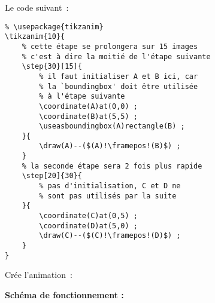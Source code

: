 \documentclass[a4paper,12pt]{article}
\begin{document}
	\begin{multicols}{2}
	{Le code suivant~:}
	\begin{lstlisting}
% \usepackage{tikzanim}
\tikzanim{10}{
	% cette étape se prolongera sur 15 images
	% c'est à dire la moitié de l'étape suivante
	\step{30}[15]{
		% il faut initialiser A et B ici, car
		% la `boundingbox' doit être utilisée
		% à l'étape suivante
		\coordinate(A)at(0,0) ;
		\coordinate(B)at(5,5) ;
		\useasboundingbox(A)rectangle(B) ;
	}{
		\draw(A)--($(A)!\framepos!(B)$) ;
	}
	% la seconde étape sera 2 fois plus rapide
	\step[20]{30}{
		% pas d'initialisation, C et D ne
		% sont pas utilisés par la suite
	}{
		\coordinate(C)at(0,5) ;
		\coordinate(D)at(5,0) ;
		\draw(C)--($(C)!\framepos!(D)$) ;
	}
}
	\end{lstlisting}
	
	{Crée l'animation~:}
	
	\bigskip
	
	\centering
	
	\end{multicols}
	
	\textbf{Schéma de fonctionnement :}
	
	\medskip
	
\newcommand{\transparentlist}[2]{
	\stepcounter{dy}	
	\foreach\f in {#1}{
		\pgfmathsetmacro{\c}{\f*5}
		\path[draw=black,fill=teal!\c!purple!75!white,fill opacity=0.75] (\f*0.1,-\thedy*0.8)node(a){} -- ++(0,0.6) -- ++(0.3,0.3)node(b){} -- ++(0,-0.6) -- cycle ;
		\path(a)--node[midway,font=\tiny,shape=rectangle]{\f} (b) ;
	}
	\node[anchor=west,shape=rectangle] at(2.5,0.4-\thedy*0.8) {#2#1} ;
}

\newcommand{\acc}[4][0pt]{
		\draw[decorate,decoration={brace,amplitude=10pt},thick,xshift=#1] (12,-0.8*#2-0.05) --node[right,xshift=10pt,text width=7cm,font=\ttfamily,shape=rectangle]{#4} (12,-0.8*#3+0.05);
}

\newcommand{\entoure}[4][red,thick,densely dashed]{
	\draw[#1] (#2*0.1-0.05,-#4*0.8-0.125) -- ++(0,{(#4-#3+1)*0.8-0.05}) -- ++(0.4,0.4) -- ++ (0,{-(#4-#3+1)*0.8+0.05}) -- cycle ;
}

\newcommand{\limite}[2][teal!50,thick,densely dotted]{
	\draw[#1](-0.2,-0.8*#2) -- (11.9,-0.8*#2) ;
}
\end{document}
